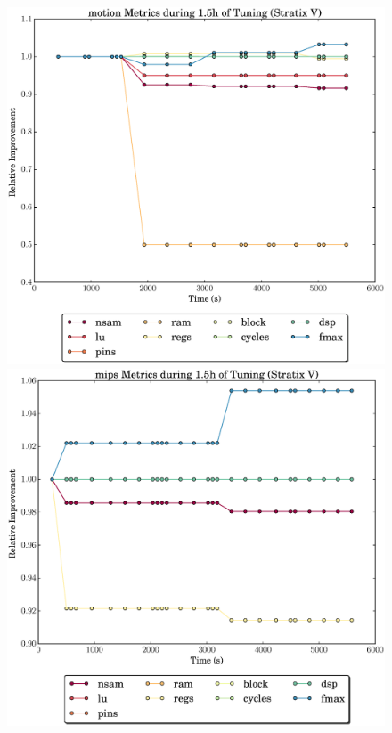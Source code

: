 \documentclass[12pt, a4paper]{article}
\begin{document}
\begin{figure}[htpb]
    \begin{minipage}{.48\textwidth}
        \includegraphics[scale=.29]{motion_all_5400_chstone_StratixV}
    \end{minipage}%
    \hfill
    \begin{minipage}{.48\textwidth}
        \includegraphics[scale=.29]{mips_all_5400_chstone_StratixV}
    \end{minipage}%
\end{figure}
\end{document}
